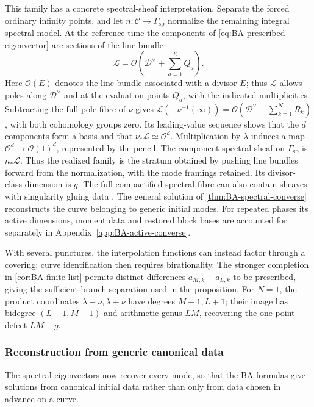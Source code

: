 This family has a concrete spectral-sheaf interpretation. Separate
the forced ordinary infinity points, and let
$n:\mathcal C\to\Gamma_{\mathrm{sp}}$ normalize the remaining
integral spectral model. At the reference time the components of
\cref{eq:BA-prescribed-eigenvector} are sections of the line bundle
\[
 \mathscr L=\mathcal O\left(\mathscr D^\vee+
                         \sum_{a=1}^{K}Q_a\right).
\]
Here $\mathcal O(E)$ denotes the line bundle associated with a divisor
$E$; thus $\mathscr L$ allows poles along $\mathscr D^\vee$ and at
the evaluation points $Q_a$, with the indicated multiplicities.
Subtracting the full pole fibre of $\nu$ gives
$\mathscr L(-\nu^{-1}(\infty))=\mathcal O(\mathscr D^\vee-
\sum_{k=1}^{N}R_k)$, with both cohomology groups zero.
Its leading-value sequence shows that the $d$ components form a
basis and that $\nu_*\mathscr L\simeq\mathcal O^d$.
Multiplication by $\lambda$ induces a map
$\mathcal O^d\to\mathcal O(1)^d$, represented by the pencil.
The component spectral sheaf on $\Gamma_{\mathrm{sp}}$ is $n_*\mathscr L$.
Thus the realized family is the stratum obtained by pushing line
bundles forward from the normalization, with the mode framings
retained. Its divisor-class dimension is $g$.
The full compactified spectral fibre can also contain sheaves with
singularity gluing data \cite{AdamsHarnadHurtubise1990II,Beauville1990}.
The general solution of
\cref{thm:BA-spectral-converse} reconstructs the curve belonging to
generic initial modes. For repeated phases its active dimensions,
moment data and restored block bases are accounted for separately
in Appendix~\ref{app:BA-active-converse}.

With several punctures, the interpolation functions can instead factor
through a covering; curve identification then requires birationality.
The stronger completion in \cref{cor:BA-finite-list} permits distinct
differences $a_{M,k}-a_{L,k}$ to be prescribed, giving the sufficient
branch separation used in the proposition.
For $N=1$, the product coordinates $\lambda-\nu,\lambda+\nu$ have
degrees $M+1,L+1$; their image has bidegree $(L+1,M+1)$ and arithmetic
genus $LM$, recovering the one-point defect $LM-g$.

\subsubsection{Reconstruction from generic canonical data}

The spectral eigenvectors now recover every mode, so that the BA
formulas give solutions from canonical initial data rather than only
from data chosen in advance on a curve.

